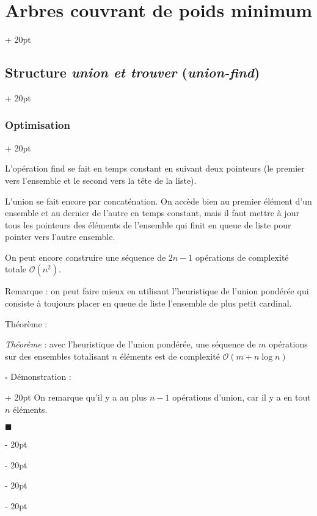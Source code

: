 \documentclass[a4paper, 12pt, twoside]{article}
\newcommand{\ind}[1][20pt]{\advance\leftskip + #1}
\newcommand{\deind}[1][20pt]{\advance\leftskip - #1}
\newenvironment{indt}[2][20pt]{#2 \par \ind[#1]}{\par \deind} %
\newenvironment{proof}[1][{Démonstration :}]{\begin{indt}{$\square$ #1}}{$\blacksquare$ \end{indt}}
\begin{document}
\begin{indt}{\section{Arbres couvrant de poids minimum}}
\begin{indt}{\subsection{Structure \textit{union et trouver} (\textit{union-find})}}
\begin{indt}{\subsubsection{Optimisation}}
\begin{center}
                \end{center}

                L'opération find se fait en temps constant en suivant deux pointeurs (le premier vers l'ensemble et le second vers la tête de la liste).

                L'union se fait encore par concaténation. On accède bien au premier élément d'un ensemble et au dernier de l'autre en temps constant, mais il faut mettre à jour tous les pointeurs des éléments de l'ensemble qui finit en queue de liste pour pointer vers l'autre ensemble.

                 On peut encore construire une séquence de $2n - 1$ opérations de complexité totale $\mathcal O(n^2)$.

                Remarque : on peut faire mieux en utilisant l'heuristique de l'union pondérée qui consiste à toujours placer en queue de liste l'ensemble de plus petit cardinal.

                \vspace{12pt}
                
                Théorème :
                \begin{pseudocode}
                    \textit{Théorème} :
                    avec l'heuristique de l'union pondérée, une séquence de $m$ opérations sur des ensembles totalisant $n$ éléments est de complexité $\mathcal O(m + n\log n)$
                \end{pseudocode}

                \begin{proof}
                    On remarque qu'il y a au plus $n - 1$ opérations d'union, car il y a en tout $n$ éléments.


\end{proof}
\end{indt}
\end{indt}
\end{indt}
\end{document}
